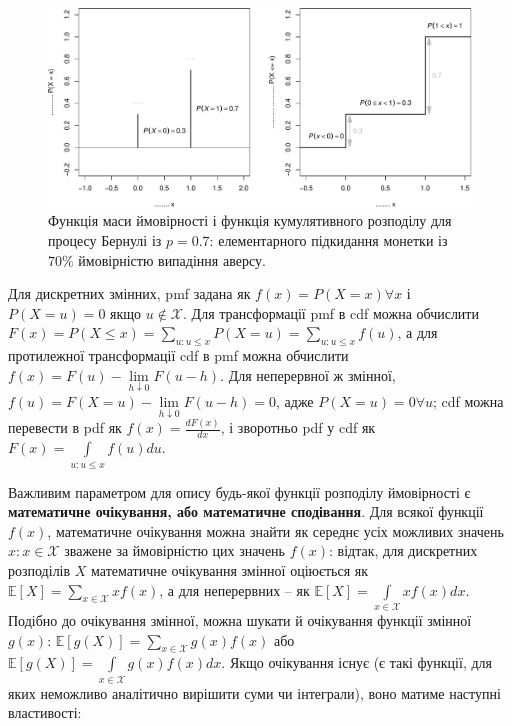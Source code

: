 \documentclass[
  11pt,
]{book}
\begin{document}
\begin{figure}
\centering
\includegraphics{bookdown-demo_files/figure-latex/fig-3-9-1.pdf}
\caption{\label{fig:fig-3-9}Функція маси ймовірності і функція кумулятивного розподілу для процесу Бернулі із \(p = 0.7\): елементарного підкидання монетки із \(70 \%\) ймовірністю випадіння аверсу.}
\end{figure}

Для дискретних змінних, pmf задана як \(f(x) = P(X = x) \forall x\) і \(P(X = u) = 0\) якщо \(u \notin \mathcal{X}\). Для трансформації pmf в cdf можна обчислити \(F(x) = P(X \leq x) = \sum \limits_{u: u \leq x} P(X = u) = \sum \limits_{u: u \leq x} f(u)\), а для протилежної трансформації cdf в pmf можна обчислити \(f(x) = F(u) - \lim \limits_{h \downarrow 0} F(u - h)\). Для неперервної ж змінної, \(f(u) = F(X = u) - \lim \limits_{h \downarrow 0} F(u - h) = 0\), адже \(P(X = u) = 0 \forall u\); cdf можна перевести в pdf як \(f(x) = \frac{d F(x)}{d x}\), і зворотньо pdf у cdf як \(F(x) = \int \limits_{u: u \leq x} f(u) du\).

Важливим параметром для опису будь-якої функції розподілу ймовірності є \textbf{математичне очікування, або математичне сподівання}. Для всякої функції \(f(x)\), математичне очікування можна знайти як середнє усіх можливих значень \(x: x \in \mathcal{X}\) зважене за ймовірністю цих значень \(f(x)\): відтак, для дискретних розподілів \(X\) математичне очікування змінної оціюється як \(\mathbb{E}[X] = \sum \limits_{x \in \mathcal{X}} x f(x)\), а для неперервних -- як \(\mathbb{E}[X] = \int \limits_{x \in \mathcal{X}} x f(x) dx\). Подібно до очікування змінної, можна шукати й очікування функції змінної \(g(x)\): \(\mathbb{E}[g(X)] = \sum \limits_{x \in \mathcal{X}} g(x) f(x)\) або \(\mathbb{E}[g(X)] = \int \limits_{x \in \mathcal{X}} g(x) f(x) dx\). Якщо очікування існує (є такі функції, для яких неможливо аналітично вирішити суми чи інтеграли), воно матиме наступні властивості:
\end{document}
